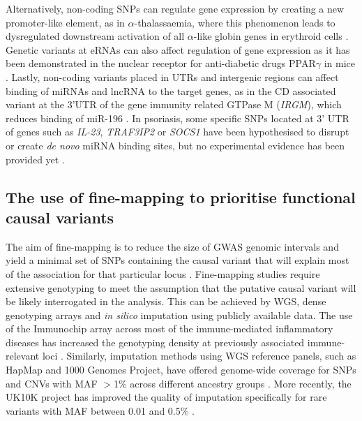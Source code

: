 Alternatively, non-coding SNPs can regulate gene expression by creating a new promoter-like element, as in $\alpha$-thalassaemia, where this phenomenon leads to dysregulated downstream activation of all $\alpha$-like globin genes in erythroid cells \parencite{Gobbi2006}. Genetic variants at eRNAs can also affect regulation of gene expression as it has been demonstrated in the nuclear receptor for anti-diabetic drugs PPAR$\gamma$ in mice \parencite{Soccio2015}. Lastly, non-coding variants placed in UTRs and intergenic regions can affect binding of miRNAs and lncRNA to the target genes, as in the CD associated variant at the 3'UTR of the gene immunity related GTPase M (\textit{IRGM}), which reduces binding of miR-196 \parencite{Brest2011}. 
In psoriasis, some specific SNPs located at 3' UTR of genes such as \textit{IL-23}, \textit{TRAF3IP2} or \textit{SOCS1} have been hypothesised to disrupt or create \textit{de novo} miRNA binding sites, but no experimental evidence has been provided yet \parencite{Pivarcsi2014}. 

\subsection{The use of fine-mapping to prioritise functional causal variants}
The aim of fine-mapping is to reduce the size of GWAS genomic intervals and yield a minimal set of SNPs containing the causal variant that will explain most of the association for that particular locus \parencite{Spain2015}. Fine-mapping studies require extensive genotyping to meet the assumption that the putative causal variant will be likely interrogated in the analysis. This can be achieved by WGS, dense genotyping arrays and \textit{in silico} imputation using publicly available data. The use of the Immunochip array across most of the immune-mediated inflammatory diseases has increased the genotyping density at previously associated immune-relevant loci  \parencite{Trynka2011}. Similarly, imputation methods using WGS reference panels, such as HapMap and 1000 Genomes Project, have offered genome-wide coverage for SNPs and CNVs with MAF $>$1\% across different ancestry groups \parencite{Abecasis2012}. More recently, the UK10K project has improved the quality of imputation specifically for rare variants with MAF between 0.01 and 0.5\% \parencite{Chou2016}. 

